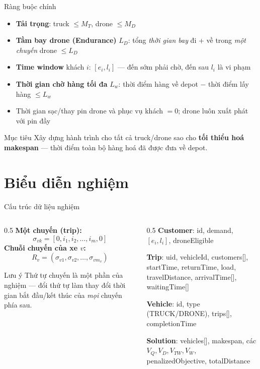 \documentclass[aspectratio=169]{beamer}
\newcommand{\hl}[1]{\textcolor{blue!60!black}{\textbf{#1}}}
\begin{document}
\begin{frame}{Ràng buộc chính}
  \begin{itemize}
    \item \hl{Tải trọng}: truck $\le M_T$, drone $\le M_D$
    \item \hl{Tầm bay drone (Endurance)} $L_D$: tổng \emph{thời gian bay} đi + về trong \emph{một chuyến} drone $\le L_D$
    \item \hl{Time window} khách $i$: $[e_i, l_i]$ — đến sớm phải chờ, đến sau $l_i$ là vi phạm
    \item \hl{Thời gian chờ hàng tối đa} $L_w$: thời điểm hàng về depot $-$ thời điểm lấy hàng $\le L_w$
    \item Thời gian sạc/thay pin drone và phục vụ khách $= 0$; drone luôn xuất phát với pin đầy
  \end{itemize}
  \vspace{2mm}
  \begin{block}{Mục tiêu}
    Xây dựng hành trình cho tất cả truck/drone sao cho \hl{tối thiểu hoá makespan} — thời điểm toàn bộ hàng hoá đã được đưa về depot.
  \end{block}
\end{frame}

\section{Biểu diễn nghiệm}

\begin{frame}{Cấu trúc dữ liệu nghiệm}
  \begin{columns}[T]
    \begin{column}{0.5\textwidth}
      \textbf{Một chuyến (trip):}
      $$\sigma_{vk} = [0, i_1, i_2, \ldots, i_m, 0]$$
      \textbf{Chuỗi chuyến của xe $v$:}
      $$R_v = (\sigma_{v1}, \sigma_{v2}, \ldots, \sigma_{vm_v})$$
      \begin{alertblock}{Lưu ý}
        Thứ tự chuyến là một phần của nghiệm — đổi thứ tự làm thay đổi thời gian bắt đầu/kết thúc của \emph{mọi} chuyến phía sau.
      \end{alertblock}
    \end{column}
    \begin{column}{0.5\textwidth}
      \small
      \textbf{Customer}: id, demand, $[e_i,l_i]$, droneEligible

      \textbf{Trip}: uid, vehicleId, customers[], startTime, returnTime, load, travelDistance, arrivalTime[], waitingTime[]

      \textbf{Vehicle}: id, type (TRUCK/DRONE), trips[], completionTime

      \textbf{Solution}: vehicles[], makespan, các $V_Q,V_D,V_{TW},V_W$, penalizedObjective, totalDistance
    \end{column}
  \end{columns}
\end{frame}
\end{document}
